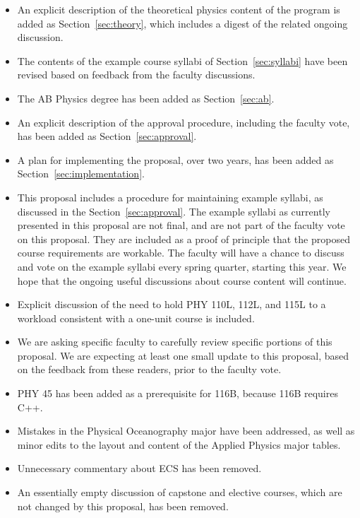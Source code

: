 \documentclass[12pt]{article}
\begin{document}
\begin{itemize}
  
 \item An explicit description of the theoretical physics content of
   the program is added as Section~\ref{sec:theory}, which includes a
   digest of the related ongoing discussion.
 \item The contents of the example course syllabi of
   Section~\ref{sec:syllabi} have been revised based on feedback from
   the faculty discussions. 
 \item The AB Physics degree has been added as Section~\ref{sec:ab}.
 \item An explicit description of the approval procedure, including
   the faculty vote, has been added as Section~\ref{sec:approval}.
 \item A plan for implementing the proposal, over two years, has been
   added as Section~\ref{sec:implementation}.
 \item This proposal includes a procedure for maintaining example
   syllabi, as discussed in the Section~\ref{sec:approval}.  The
   example syllabi as currently presented in this proposal are not
   final, and are not part of the faculty vote on this proposal.  They
   are included as a proof of principle that the proposed course
   requirements are workable.  The faculty will have a chance to
   discuss and vote on the example syllabi every spring quarter,
   starting this year.  We hope that the ongoing useful discussions
   about course content will continue.   
 \item Explicit discussion of the need to hold PHY 110L, 112L, and 115L to
   a workload consistent with a one-unit course is included.
 \item We are asking specific faculty to carefully review specific
   portions of this proposal.  We are expecting at least one small
   update to this proposal, based on the feedback from these readers,
   prior to the faculty vote.   
 \item PHY 45 has been added as a prerequisite for 116B, because 116B requires C++.
 \item Mistakes in the Physical Oceanography major have been
   addressed, as well as minor edits to the layout and content of the
   Applied Physics major tables.   
 \item Unnecessary commentary about ECS has been removed.
 \item An essentially empty discussion of capstone and elective
   courses, which are not changed by this proposal, has been removed.
\end{itemize}
\end{document}
